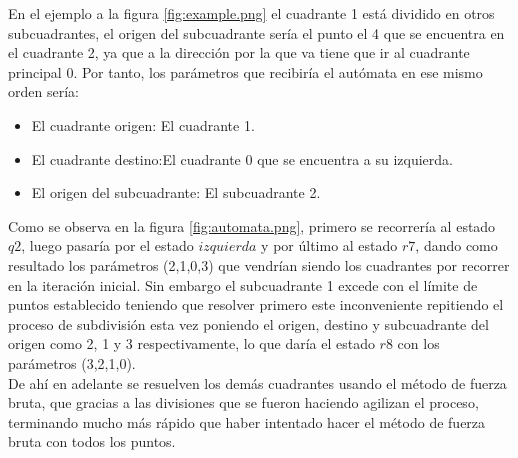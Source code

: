     
\hspace*{1cm} En el ejemplo a la figura \ref {fig:example.png} el cuadrante 1 está dividido en otros subcuadrantes, el origen del subcuadrante sería el punto el 4 que se encuentra en el cuadrante 2, ya que a la dirección por la que va tiene que ir al cuadrante principal 0. Por tanto, los parámetros que recibiría el autómata en ese mismo orden sería: 

\begin{itemize}
\item El cuadrante origen: El cuadrante 1.
\item El cuadrante destino:El cuadrante 0 que se encuentra a su izquierda.
\item El origen del subcuadrante: El subcuadrante 2.
\end{itemize}

\hspace*{1cm}Como se observa en la figura \ref {fig:automata.png}, primero se recorrería al estado $q2$, luego pasaría por el estado $izquierda$ y por último al estado $r7$, dando como resultado los parámetros (2,1,0,3) que vendrían siendo los cuadrantes por recorrer en la iteración inicial. Sin embargo el subcuadrante 1 excede con el límite de puntos establecido teniendo que resolver primero este inconveniente repitiendo el proceso de subdivisión esta vez poniendo el origen, destino y subcuadrante del origen como 2, 1 y 3 respectivamente, lo que daría el estado $r8$ con los parámetros (3,2,1,0).\\
\hspace*{1cm} De ahí en adelante se resuelven los demás cuadrantes usando el método de fuerza bruta, que gracias a las divisiones que se fueron haciendo agilizan el proceso, terminando mucho más rápido que haber intentado hacer el método de fuerza bruta con todos los puntos.\\

